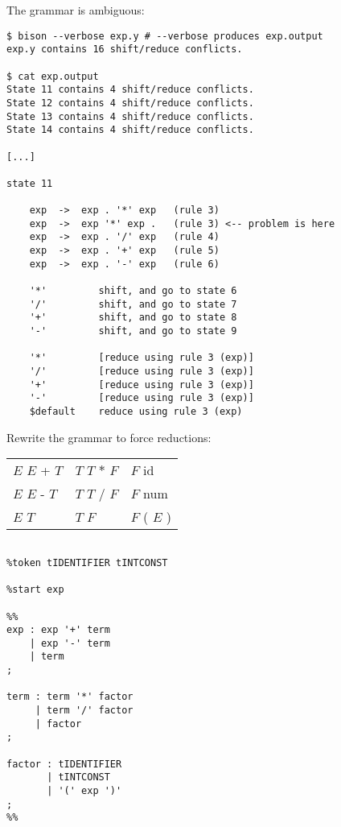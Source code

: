 \begin{slide*}
The grammar is ambiguous:

\begin{scriptsize}
\begin{verbatim}
$ bison --verbose exp.y # --verbose produces exp.output
exp.y contains 16 shift/reduce conflicts.

$ cat exp.output
State 11 contains 4 shift/reduce conflicts.
State 12 contains 4 shift/reduce conflicts.
State 13 contains 4 shift/reduce conflicts.
State 14 contains 4 shift/reduce conflicts.

[...]

state 11
 
    exp  ->  exp . '*' exp   (rule 3)
    exp  ->  exp '*' exp .   (rule 3) <-- problem is here
    exp  ->  exp . '/' exp   (rule 4)
    exp  ->  exp . '+' exp   (rule 5)
    exp  ->  exp . '-' exp   (rule 6)
 
    '*'         shift, and go to state 6
    '/'         shift, and go to state 7
    '+'         shift, and go to state 8
    '-'         shift, and go to state 9
 
    '*'         [reduce using rule 3 (exp)]
    '/'         [reduce using rule 3 (exp)]
    '+'         [reduce using rule 3 (exp)]
    '-'         [reduce using rule 3 (exp)]
    $default    reduce using rule 3 (exp)
\end{verbatim}
\end{scriptsize}
\vfil
\end{slide*}

\begin{slide*}
Rewrite the grammar to force reductions:

\begin{tabular}{l@{~~~~~~}l@{~~~~~~}l}
$E$ \RA{} $E$ + $T$ & $T$ \RA{} $T$ $*$ $F$ & $F$ \RA{} id\\
$E$ \RA{} $E$ - $T$ & $T$ \RA{} $T$ $/$ $F$ & $F$ \RA{} num\\
$E$ \RA{} $T$ & $T$ \RA{} $F$ & $F$ \RA{} ( $E$ ) 
\end{tabular}

\begin{scriptsize}
\begin{verbatim}

%token tIDENTIFIER tINTCONST

%start exp

%% 
exp : exp '+' term
    | exp '-' term
    | term
;

term : term '*' factor
     | term '/' factor
     | factor
;

factor : tIDENTIFIER
       | tINTCONST
       | '(' exp ')'
;
%%
\end{verbatim}
\end{scriptsize}
\vfil
\end{slide*}

